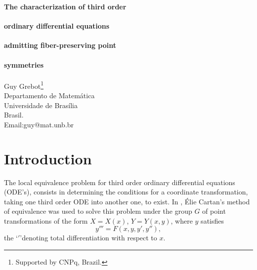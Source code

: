 
\textwidth 16cm
\textheight 24cm
\oddsidemargin 0cm
\evensidemargin 0cm
\topmargin -2cm
\headheight 0cm
\footheight 1cm

\newtheorem{re}{Result}


\Large

\begin{center}
{\LARGE {\bf The characterization of third order}}\\ ~\\
{\LARGE {\bf ordinary differential equations}}\\ ~\\
{\LARGE {\bf admitting fiber-preserving point}}\\~\\ 
{\LARGE {\bf symmetries}} \\~\\
{\footnotesize Guy Grebot}\footnote{Supported by CNPq, Brazil.} \\
{\scriptsize Departamento de Matem\'{a}tica} \\
{\scriptsize Universidade de Bras\'{i}lia} \\
{\scriptsize Brasil.} \\
{\footnotesize Email:guy@mat.unb.br}
\end{center}

\begin{abstract}
Third order ordinary differential equations are characterized 
with respect to the dimension of the symmetry group of fiber preserving 
point transformations they admit.  For the symmetry groups of dimension 
greater or equal to 4, we obtain parametric families of equations 
admitting those groups. The equivalence classes of linear equations are 
also explicitly given. The results presented are 
based on the solution of the local equivalence problem for third order 
ordinary differential equations under fiber preserving point transformations.
\end{abstract}

\section{Introduction}

The local equivalence problem for third order ordinary differential 
equations (ODE's), consists in determining the conditions for 
a coordinate transformation, taking one third order ODE into 
another one, to exist. 
In \cite{T_Grebot94}, \'{E}lie Cartan's method of equivalence was  
used to solve this problem under the group $G$ of point transformations of 
the form $X=X(x)$, $Y=Y(x,y)$, where $y$ satisfies 
\begin{displaymath}
y'''=F(x,y,y',y''),
\end{displaymath}
the \lq $'$\rq denoting total differentiation with respect to $x$.

